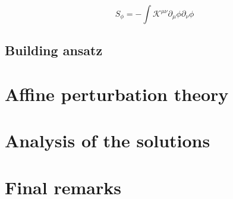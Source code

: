 \documentclass{article}
\begin{document}
\begin{equation}
    \label{PAG_4D_scalar_field}
    S_\phi = -\int \mathcal{K}^{\mu\nu}\partial_\mu \phi\partial_\nu \phi
\end{equation}

\subsection{Building ansatz}
\label{subsec:building ansatz}

\section{Affine perturbation theory}
\label{sec:affine perturbations}

\section{Analysis of the solutions}
\label{subsec:solutions}

\section{Final remarks}
\label{sec:final remarks}





\end{document}

